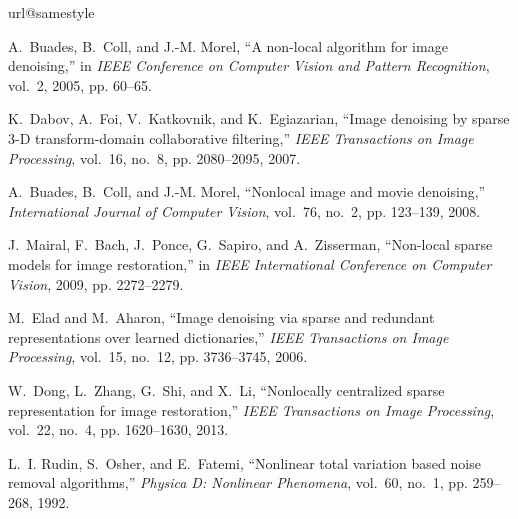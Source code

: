 \documentclass[journal]{IEEEtran}
\begin{document}
\begin{thebibliography}{10}
\providecommand{\url}[1]{#1}
\csname url@samestyle\endcsname
\providecommand{\newblock}{\relax}
\providecommand{\bibinfo}[2]{#2}
\providecommand{\BIBentrySTDinterwordspacing}{\spaceskip=0pt\relax}
\providecommand{\BIBentryALTinterwordstretchfactor}{4}
\providecommand{\BIBentryALTinterwordspacing}{\spaceskip=\fontdimen2\font plus
\BIBentryALTinterwordstretchfactor\fontdimen3\font minus
  \fontdimen4\font\relax}
\providecommand{\BIBforeignlanguage}[2]{{\expandafter\ifx\csname l@#1\endcsname\relax
\typeout{** WARNING: IEEEtran.bst: No hyphenation pattern has been}\typeout{** loaded for the language `#1'. Using the pattern for}\typeout{** the default language instead.}\else
\language=\csname l@#1\endcsname
\fi
#2}}
\providecommand{\BIBdecl}{\relax}
\BIBdecl

A.~Buades, B.~Coll, and J.-M. Morel, ``A non-local algorithm for image
  denoising,'' in \emph{IEEE Conference on Computer Vision and Pattern
  Recognition}, vol.~2, 2005, pp. 60--65.

K.~Dabov, A.~Foi, V.~Katkovnik, and K.~Egiazarian, ``Image denoising by sparse
  3-{D} transform-domain collaborative filtering,'' \emph{IEEE Transactions on
  Image Processing}, vol.~16, no.~8, pp. 2080--2095, 2007.

A.~Buades, B.~Coll, and J.-M. Morel, ``Nonlocal image and movie denoising,''
  \emph{International Journal of Computer Vision}, vol.~76, no.~2, pp.
  123--139, 2008.

J.~Mairal, F.~Bach, J.~Ponce, G.~Sapiro, and A.~Zisserman, ``Non-local sparse
  models for image restoration,'' in \emph{IEEE International Conference on
  Computer Vision}, 2009, pp. 2272--2279.

M.~Elad and M.~Aharon, ``Image denoising via sparse and redundant
  representations over learned dictionaries,'' \emph{IEEE Transactions on Image
  Processing}, vol.~15, no.~12, pp. 3736--3745, 2006.

W.~Dong, L.~Zhang, G.~Shi, and X.~Li, ``Nonlocally centralized sparse
  representation for image restoration,'' \emph{IEEE Transactions on Image
  Processing}, vol.~22, no.~4, pp. 1620--1630, 2013.

L.~I. Rudin, S.~Osher, and E.~Fatemi, ``Nonlinear total variation based noise
  removal algorithms,'' \emph{Physica D: Nonlinear Phenomena}, vol.~60, no.~1,
  pp. 259--268, 1992.


\end{thebibliography}
\end{document}
